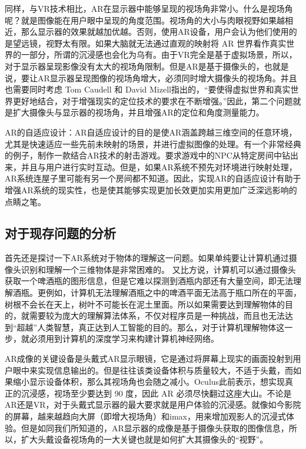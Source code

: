 \documentclass{article}
\begin{document}
同样，与VR技术相比，AR在显示器中能够呈现的视场角非常小。什么是视场角呢？就是图像能在用户眼中呈现的角度范围。视场角的大小与肉眼视野如果越相近，那么显示器的效果就越加优越。否则，使用AR设备，用户会认为他们使用的是望远镜，视野太有限。如果大脑就无法通过直观的映射将 AR 世界看作真实世界的一部分，所谓的沉浸感也会化为乌有。由于VR完全是基于虚拟场景，所以，对于显示器呈现影像没有太大的视场角限制。但是AR是基于摄像头的，也就是说，要让AR显示器呈现图像的视场角增大，必须同时增大摄像头的视场角。并且也需要同时考虑 Tom Caudell 和 David Mizell指出的，“要使得虚拟世界和真实世界更好地结合，对于增强现实的定位技术的要求在不断增强。”因此，第二个问题就是扩大摄像头与显示器的视场角，并且增强AR的定位和角度测量能力。\par

AR的自适应设计：AR自适应设计的目的是使AR涵盖跨越三维空间的任意环境，尤其是快速适应一些先前未映射的场景，并进行虚拟图像的处理。有一个非常经典的例子，制作一款结合AR技术的射击游戏。要求游戏中的NPC从特定房间中钻出来，并且与用户进行实时互动。但是，如果AR系统不预先对环境进行映射处理，AR系统连屋子里可能有另一个房间都不知道。因此，实现AR的自适应设计有助于增强AR系统的现实性，也是使其能够实现更加长效更加实用更加广泛深远影响的点睛之笔。\par

\subsection{对于现存问题的分析}
首先还是探讨一下AR系统对于物体的理解这一问题。如果单纯要让计算机通过摄像头识别和理解一个三维物体是非常困难的。
又比方说，计算机可以通过摄像头获取一个啤酒瓶的图形信息，但是它难以探测到酒瓶内部还有大量空间，即无法理解酒瓶。更例如，计算机无法理解酒瓶之中的啤酒平面无法高于瓶口所在的平面，树根不会长在天上，树叶不可能长在泥土里面。所以如果需要达到理解物体的目的，就需要较为庞大的理解算法体系，不仅对程序员是一种挑战，而且也无法达到“超越”人类智慧，真正达到人工智能的目的。那么，对于计算机理解物体这一步，就必须用到计算机的深度学习来构建计算机神经网络。\par

AR成像的关键设备是头戴式AR显示眼镜，它是通过将屏幕上现实的画面投射到用户眼中来实现信息输出的。但是往往该类设备体积与质量较大，不适于头戴，而如果缩小显示设备体积，那么其视场角也会随之减小。Oculus此前表示，想实现真正的沉浸感，视场至少要达到 90 度，因此 AR 必须尽快翻过这座大山。不论是AR还是VR，对于头戴式显示器的最大要求就是用户体验的沉浸感。就像如今影院的屏幕，越来越趋向大屏（即增大视场角）和imax，用来增加观影人的沉浸式体验。但是如同我们所知道的，AR显示器的成像是基于摄像头获取的图像信息，所以，扩大头戴设备视场角的一大关键也就是如何扩大其摄像头的“视野”。\par
\end{document}
